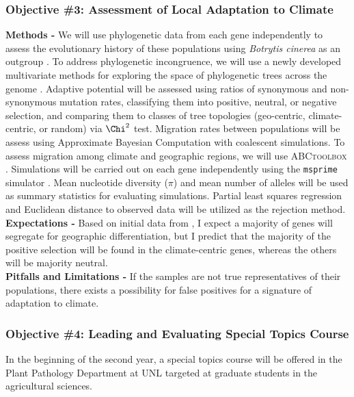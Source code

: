 \documentclass[12pt,letterpaper]{article}
\begin{document}
\subsubsection{Objective \#3: Assessment of Local Adaptation to Climate}

\noindent \textbf{Methods -} 
We will use phylogenetic data from each gene independently to assess the evolutionary history of these populations using \textit{Botrytis cinerea} as an outgroup \citep{staats2012genome}. 
To address phylogenetic incongruence, we will use a newly developed multivariate methods for exploring the space of phylogenetic trees across the genome \citep{kendall2016mapping, jombart2017treespace}. 
Adaptive potential will be assessed using ratios of synonymous and non-synonymous mutation rates, classifying them into positive, neutral, or negative selection, and comparing them to classes of tree topologies (geo-centric, climate-centric, or random) via $\Chi^2$ test.
Migration rates between populations will be assess using Approximate Bayesian Computation with coalescent simulations. 
To assess migration among climate and geographic regions, we will use \textsc{ABCtoolbox} \citep{wegmann2010abctoolbox}. 
Simulations will be carried out on each gene independently using the \texttt{msprime} simulator \citep{kelleher2016efficient}. 
Mean nucleotide diversity ($\pi$) and mean number of alleles will be used as summary statistics for evaluating simulations. 
Partial least squares regression and Euclidean distance to observed data will be utilized as the rejection method.\\
\noindent \textbf{Expectations -}
Based on initial data from \citet{attanayake2013sclerotinia}, I expect a majority of genes will segregate for geographic differentiation, but I predict that the majority of the positive selection will be found in the climate-centric genes, whereas the others will be majority neutral.\\
\noindent \textbf{Pitfalls and Limitations -}
If the samples are not true representatives of their populations, there exists a possibility for false positives for a signature of adaptation to climate.\\

\subsubsection{Objective \#4: Leading and Evaluating Special Topics Course}

In the beginning of the second year, a special topics course will be offered in the Plant Pathology Department at UNL targeted at graduate students in the agricultural sciences.
\end{document}
